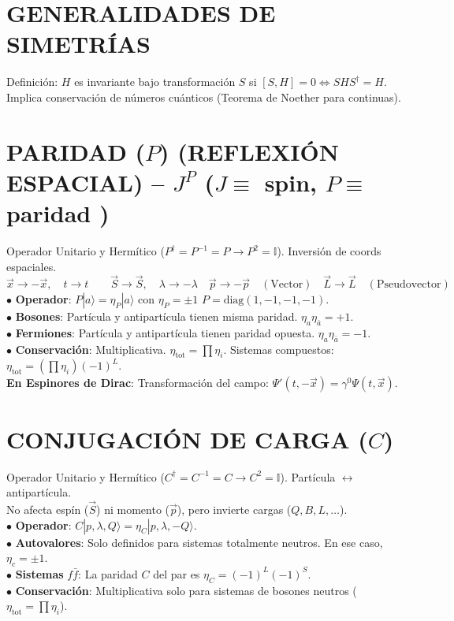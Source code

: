 \section{GENERALIDADES DE SIMETRÍAS}
Definición: $H$ es invariante bajo transformación $S$ si $[S, H] = 0 \iff S H S^\dagger = H$.\\
Implica conservación de números cuánticos (Teorema de Noether para continuas).

\section{PARIDAD ($P$) (REFLEXIÓN ESPACIAL) --  $J^P$ ($J\equiv$ spin, $P\equiv$ paridad )}
Operador Unitario y Hermítico ($P^\dagger = P^{-1} = P \rightarrow P^2=\mathbb{I}$). Inversión de coords espaciales.
 $\vec{x} \to -\vec{x},  \quad t \to t\quad \quad \vec{S} \to \vec{S}, \quad \lambda \to -\lambda \quad \vec{p} \to -\vec{p} \quad (\text{Vector}) \quad 
      \vec{L} \to  \vec{L} \quad (\text{Pseudovector})$ \\
$\bullet$ \textbf{Operador}: $P|a\rangle = \eta_P |a\rangle$ con $\eta_P = \pm 1$ \quad $P = \text{diag}(1,-1,-1,-1)$.
\\$\bullet$ \textbf{Bosones}: Partícula y antipartícula tienen misma paridad. $\eta_a \eta_{\bar{a}} = +1$.\\
$\bullet$ \textbf{Fermiones}: Partícula y antipartícula tienen paridad opuesta. $\eta_a \eta_{\bar{a}} = -1$.\\
$\bullet$ \textbf{Conservación}: Multiplicativa. $\eta_{\text{tot}} = \prod \eta_i$. Sistemas compuestos: $\eta_{\text{tot}} = (\prod \eta_i) (-1)^L$. \\
\textbf{En Espinores de Dirac}: Transformación del campo: $\Psi'(t, -\vec{x}) = \gamma^0 \Psi(t, \vec{x})$.

\section{CONJUGACIÓN DE CARGA ($C$)}
Operador Unitario y Hermítico ($C^\dagger = C^{-1} = C \rightarrow C^2  = \mathbb{I} $). Partícula $\leftrightarrow$ antipartícula.\\
No afecta espín ($\vec{S}$) ni momento ($\vec{p}$), pero invierte cargas ($Q, B, L, \dots$).\\
$\bullet$ \textbf{Operador}: $ C|p, \lambda, Q\rangle = \eta_C |p, \lambda, -Q\rangle$.\\
$\bullet$ \textbf{Autovalores}: Solo definidos para sistemas totalmente neutros. En ese caso, $\eta_c = \pm 1.$\\
$\bullet$ \textbf{Sistemas} $f\bar{f}$: La paridad $C$ del par es $\eta_C = (-1)^L (-1)^S$.\\
$\bullet$ \textbf{Conservación}: Multiplicativa solo para sistemas de bosones neutros ($\eta_{\text{tot}} = \prod \eta_i$).\\

